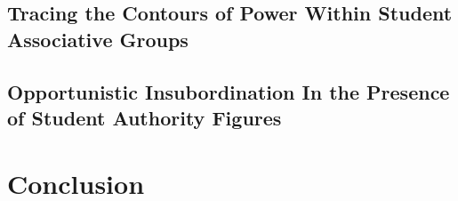 \documentclass[12pt]{article}
\begin{document}
	\subsection{Tracing the Contours of Power Within Student Associative Groups}
	\subsection{Opportunistic Insubordination In the Presence of Student Authority Figures}
	
	\section{Conclusion}
	
	\pagebreak
	
\end{document}
